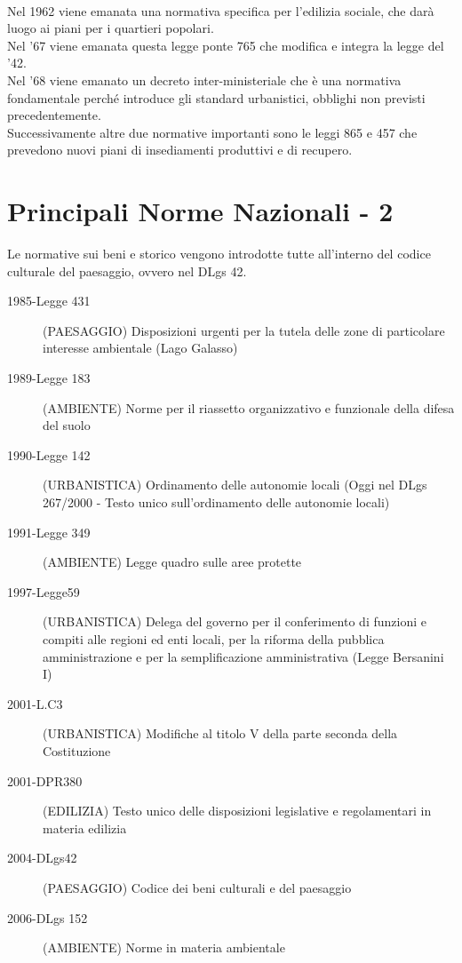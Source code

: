 \documentclass[a4paper,12pt, oneside]{book}
\begin{document}
\leavevmode\\  
Nel 1962 viene emanata una normativa specifica per l'edilizia sociale, che darà luogo ai piani per i quartieri popolari.\\
Nel '67 viene emanata questa legge ponte 765 che modifica e integra la legge del '42.\\
Nel '68 viene emanato un decreto inter-ministeriale che è una normativa fondamentale perché introduce gli standard urbanistici, obblighi non previsti precedentemente.\\
Successivamente altre due normative importanti sono le leggi 865 e 457 che prevedono nuovi piani di insediamenti produttivi e di recupero.\\
\section{Principali Norme Nazionali - 2}
Le normative sui beni e storico vengono introdotte tutte all'interno del codice culturale del paesaggio, ovvero nel DLgs 42.
\begin{description}
	\item [1985-Legge 431] (PAESAGGIO) Disposizioni urgenti per la tutela delle zone di particolare interesse ambientale (Lago Galasso)
	\item [1989-Legge 183] (AMBIENTE) Norme per il riassetto organizzativo e funzionale della difesa del suolo
	\item [1990-Legge 142] (URBANISTICA) Ordinamento delle autonomie locali (Oggi nel DLgs 267/2000 - Testo unico sull'ordinamento delle autonomie locali)
	\item [1991-Legge 349] (AMBIENTE) Legge quadro sulle aree protette
	\item [1997-Legge\phantom{a}59] (URBANISTICA) Delega del governo per il conferimento di funzioni e compiti alle regioni ed enti locali, per la riforma della pubblica amministrazione e per la semplificazione amministrativa (Legge Bersanini I)
	\item [2001-L.C\phantom{aaaa}3] (URBANISTICA) Modifiche al titolo V della parte seconda della Costituzione
	\item [2001-DPR\phantom{a}380] (EDILIZIA) Testo unico delle disposizioni legislative e regolamentari in materia edilizia
	\item [2004-DLgs\phantom{*4}42] (PAESAGGIO) Codice dei beni culturali e del paesaggio
	\item [2006-DLgs 152] (AMBIENTE) Norme in materia ambientale
\end{description}
\end{document}
